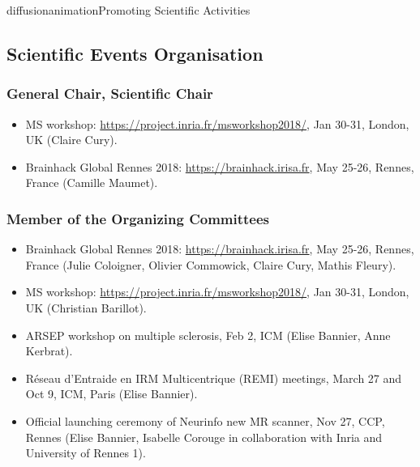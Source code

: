 \documentclass{ra2018}
\begin{document}


\begin{module}{diffusion}{animation}{Promoting Scientific Activities}



\subsection{Scientific Events Organisation}
    \subsubsection{General Chair, Scientific Chair}
    \begin{itemize}
        \item MS workshop: \url{https://project.inria.fr/msworkshop2018/}, Jan 30-31, London, UK (Claire Cury).
        \item Brainhack Global Rennes 2018: \url{https://brainhack.irisa.fr}, May 25-26, Rennes, France (Camille Maumet).
    \end{itemize}    
    

    \subsubsection{Member of the Organizing Committees}
    \begin{itemize}
        \item Brainhack Global Rennes 2018: \url{https://brainhack.irisa.fr}, May 25-26, Rennes, France (Julie Coloigner, Olivier Commowick, Claire Cury, Mathis Fleury).
	    \item MS workshop: \url{https://project.inria.fr/msworkshop2018/}, Jan 30-31, London, UK (Christian Barillot).
        \item ARSEP workshop on multiple sclerosis, Feb 2, ICM (Elise Bannier, Anne Kerbrat).
        \item Réseau d'Entraide en IRM Multicentrique (REMI) meetings, March 27 and Oct 9, ICM, Paris (Elise Bannier).
        \item Official launching ceremony of Neurinfo new MR scanner, Nov 27, CCP, Rennes (Elise Bannier, Isabelle Corouge in collaboration with Inria and University of Rennes 1).
    \end{itemize}    

\end{module}
\end{document}
